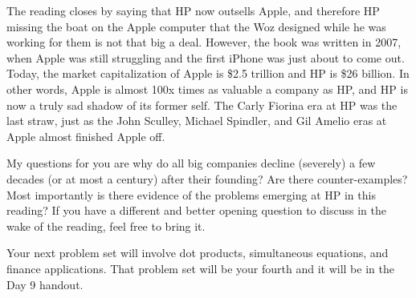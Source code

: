 \nobreak\bigskip

\noindent The reading closes by saying that HP now outsells Apple, and therefore HP missing the boat on the Apple computer that the Woz designed while he was working for them is not that big a deal. However, the book was written in 2007, when Apple was still struggling and the first iPhone was just about to come out. Today, the market capitalization of Apple is \$2.5 trillion and HP is \$26 billion. In other words, Apple is almost 100x times as valuable a company as HP, and HP is now a truly sad shadow of its former self. The Carly Fiorina era at HP was the last straw, just as the John Sculley, Michael Spindler, and Gil Amelio eras at Apple almost finished Apple off.

My questions for you are why do all big companies decline (severely) a few decades (or at most a century) after their founding? Are there counter-examples? Most importantly is there evidence of the problems emerging at HP in this reading? If you have a different and better opening question to discuss in the wake of the reading, feel free to bring it.

\bigskip

\nobreak\bigskip

\noindent Your next problem set will involve dot products, simultaneous equations, and finance applications. That problem set will be your fourth and it will be in the Day 9 handout.

\bigskip

\bye
